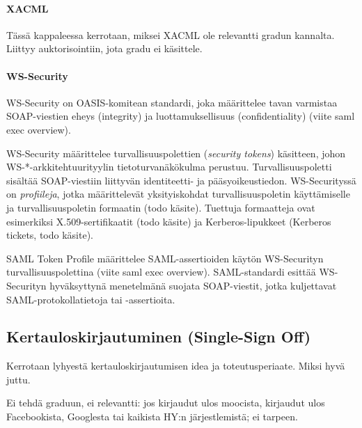 \documentclass[finnish,gradu]{tktltiki}
\begin{document}

  \paragraph{XACML} %
  \label{par:xacml}
  Tässä kappaleessa kerrotaan, miksei XACML ole relevantti gradun kannalta. Liittyy auktorisointiin, jota gradu ei käsittele.


  \paragraph{WS-Security} %
  \label{par:ws_security}
  WS-Security on OASIS-komitean standardi, joka määrittelee tavan varmistaa SOAP-viestien eheys (integrity) ja luottamuksellisuus (confidentiality) (viite saml exec overview).

  WS-Security määrittelee turvallisuuspolettien (\emph{security tokens}) käsitteen, johon WS-*-arkkitehtuurityylin tietoturvanäkökulma perustuu.
  Turvallisuuspoletti sisältää SOAP-viestiin liittyvän identiteetti- ja pääsyoikeustiedon.
  WS-Securityssä on \emph{profiileja}, jotka määrittelevät yksityiskohdat turvallisuuspoletin käyttämiselle ja turvallisuuspoletin formaatin (todo käsite).
  Tuettuja formaatteja ovat esimerkiksi X.509-sertifikaatit (todo käsite) ja Kerberos-lipukkeet (Kerberos tickets, todo käsite).

  SAML Token Profile määrittelee SAML-assertioiden käytön WS-Securityn turvallisuuspolettina (viite saml exec overview).
  SAML-standardi esittää WS-Securityn hyväksyttynä menetelmänä suojata SOAP-viestit, jotka kuljettavat SAML-protokollatietoja tai -assertioita.





  \subsection{Kertauloskirjautuminen (Single-Sign Off)} %
  \label{sub:kertauloskirjautuminen}
  Kerrotaan lyhyestä kertauloskirjautumisen idea ja toteutusperiaate. Miksi hyvä juttu.

  Ei tehdä graduun, ei relevantti: jos kirjaudut ulos moocista, kirjaudut ulos Facebookista, Googlesta tai kaikista HY:n järjestlemistä; ei tarpeen.
\end{document}
